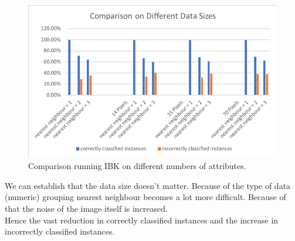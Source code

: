 \documentclass[12pt]{article}
\begin{document}
\begin{figure}[H]
	\centering
	\includegraphics[width=0.7\linewidth]{images/masters2}
	\caption{Comparison running IBK on different numbers of attributes.}
	\label{fig:masters2}
\end{figure}

We can establish that the data size doesn't matter. Because of the type of data (numeric) grouping nearest neighbour becomes a lot more difficult. Because of that the noise of the image itself is increased.\\

Hence the vast reduction in correctly classified instances and the increase in incorrectly classified instances.\\

\newpage
\printbibliography
	
\end{document}

